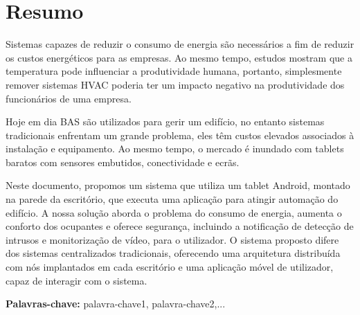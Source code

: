 \chapter*{Resumo}




Sistemas capazes de reduzir o consumo de energia são necessários a fim de reduzir os custos energéticos para as empresas. Ao mesmo tempo, estudos mostram que a temperatura pode influenciar a produtividade humana, portanto, simplesmente remover sistemas HVAC poderia ter um impacto negativo na produtividade dos funcionários de uma empresa.

Hoje em dia \ac{BAS} são utilizados para gerir um edifício, no entanto sistemas tradicionais enfrentam um grande problema, eles têm custos elevados associados à instalação e equipamento. Ao mesmo tempo, o mercado é inundado com tablets baratos com sensores embutidos, conectividade e ecrãs.



Neste documento, propomos um sistema que utiliza um tablet Android, montado na parede da escritório, que executa uma aplicação para atingir automação do edifício. A nossa solução aborda o problema do consumo de energia, aumenta o conforto dos ocupantes e oferece segurança, incluindo a notificação de detecção de intrusos e monitorização de vídeo, para o utilizador. O sistema proposto difere dos sistemas centralizados tradicionais, oferecendo uma arquitetura distribuída com nós implantados em cada escritório e uma aplicação móvel de utilizador, capaz de interagir com o sistema.






\vspace{1cm}

\textbf{\Large Palavras-chave:} palavra-chave1, palavra-chave2,...

\cleardoublepage

